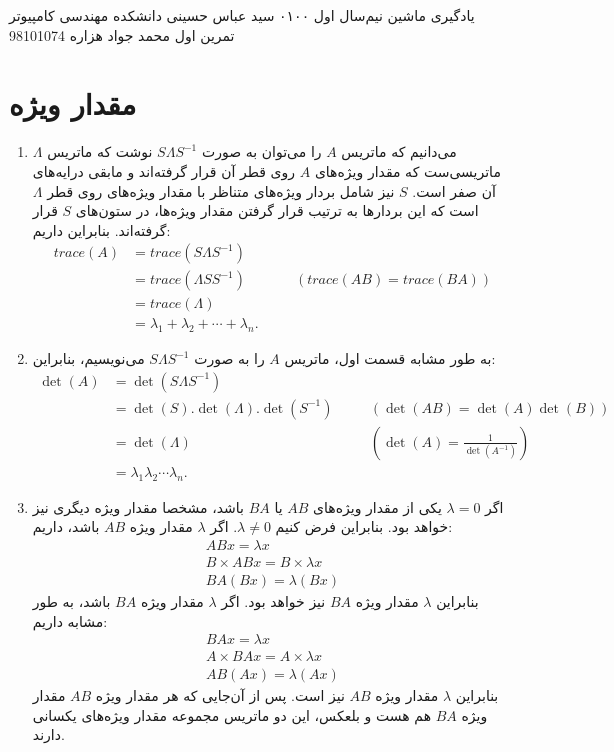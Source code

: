 \documentclass[a4paper, 11pt]{article}
\begin{document}
\handout
{یادگیری ماشین}
{نیم‌سال اول ۰۱\lr{-}۰۰}
{سید عباس حسینی}
{دانشکده مهندسی کامپیوتر}
{تمرین اول}
{محمد جواد هزاره}
{98101074}
\noindent
\\ [-5em]
\section{مقدار ویژه}
\begin{enumerate}[1.]
	\item
	می‌دانیم که ماتریس $A$ را می‌توان به صورت
	$S\Lambda S^{-1}$
	نوشت که ماتریس $\Lambda$ ماتریسی‌ست که مقدار ویژه‌های $A$ روی قطر آن قرار گرفته‌اند و مابقی درایه‌های آن صفر است. $S$ نیز شامل بردار ویژه‌های متناظر با مقدار ویژه‌های روی قطر $\Lambda$ است که این بردار‌ها به ترتیب قرار گرفتن مقدار ویژه‌ها، در ستون‌های $S$ قرار گرفته‌اند. بنابراین داریم:
	\[
	\begin{aligned}
		trace(A)	&= trace(S\Lambda S^{-1}) \\
					&= trace(\Lambda SS^{-1}) && \quad (trace(AB) = trace(BA)) \\
					&= trace(\Lambda) \\
					&= \lambda_1 + \lambda_2 + \cdots + \lambda_n.
	\end{aligned}
	\]
	\item
	به طور مشابه قسمت اول، ماتریس $A$ را به صورت 
	$S\Lambda S^{-1}$
	می‌نویسیم، بنابراین:
	\[
	\begin{aligned}
		\det(A)	&= \det(S\Lambda S^{-1}) \\
				&= \det(S).\det(\Lambda).\det(S^{-1}) && \quad (\det(AB) = \det(A)\det(B))\\
				&= \det(\Lambda) && \quad \left(\det(A) = \frac{1}{\det(A^{-1})}\right)\\
				&= \lambda_1\lambda_2\cdots\lambda_n.
	\end{aligned}
	\]
	\item
	اگر $\lambda = 0$ یکی از مقدار ویژه‌های $AB$ یا $BA$ باشد، مشخصا مقدار ویژه دیگری نیز خواهد بود. بنابراین فرض کنیم
	$\lambda \ne 0$.
	اگر $\lambda$ مقدار ویژه $AB$ باشد، داریم:
	\[
	\begin{gathered}
		ABx = \lambda x\\
		B \times AB x = B \times \lambda x\\
		BA (Bx) = \lambda (Bx)
	\end{gathered}
	\]
	بنابراین $\lambda$ مقدار ویژه $BA$ نیز خواهد بود. اگر $\lambda$ مقدار ویژه $BA$ باشد، به طور مشابه داریم:
	\[
	\begin{gathered}
		BAx = \lambda x\\
		A \times BA x = A \times \lambda x\\
		AB (Ax) = \lambda (Ax)
	\end{gathered}
	\]
	بنابراین $\lambda$ مقدار ویژه $AB$ نیز است. پس از آن‌جایی که هر مقدار ویژه $AB$ مقدار ویژه $BA$ هم هست و بلعکس، این دو ماتریس مجموعه مقدار ویژه‌های یکسانی دارند.
	

\end{enumerate}
\end{document}
